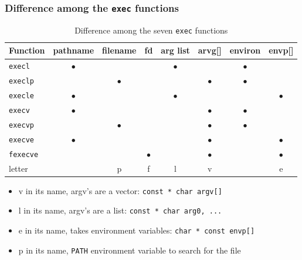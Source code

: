 \documentclass[newPxFont,sthlmFooter,nooffset]{beamer}
\begin{document}
\begin{frame}[t]
  \frametitle{Difference among the \texttt{exec} functions}
  \begin{table}[h]
    \centering\footnotesize
    \begin{tabular}{l | *{3}{ c | }| *{2} { c | } | c | c }
      Function & pathname & filename & fd & arg list & arvg[] & environ & envp[] \\ \hline
      \texttt{execl} & $\bullet$  &   &   & $\bullet$  &    & $\bullet$   &     \\ 
      \texttt{execlp} &   & $\bullet$  &   &   &  $\bullet$  & $\bullet$   &     \\
      \texttt{execle} & $\bullet$   &   &   & $\bullet$  &    &    & $\bullet$    \\
      \texttt{execv} & $\bullet$  &   &   &   &   $\bullet$ & $\bullet$   &     \\ 
      \texttt{execvp} &   & $\bullet$  &   &   &  $\bullet$  & $\bullet$   &     \\
      \texttt{execve} & $\bullet$  &   &   &   &  $\bullet$  &    &  $\bullet$   \\
      \texttt{fexecve} &   &   & $\bullet$  &   & $\bullet$   &    & $\bullet$    \\ \hline
      letter &   & p  & f   & l  &  v  &    & e    \\ 
    \end{tabular}
    \caption{Difference among the seven \texttt{exec} functions}
    \label{tab:diff-exec}
  \end{table}
  \begin{itemize}
  \item v in its name, argv's are a vector: \texttt{const * char argv[]}
  \item l in its name, argv's are a list: \texttt{const * char arg0, ...}
  \item e in its name, takes environment variables: \texttt{char * const envp[]}
  \item p in its name, \texttt{PATH} environment variable to search for the file
  \end{itemize}
\end{frame}
\end{document}
